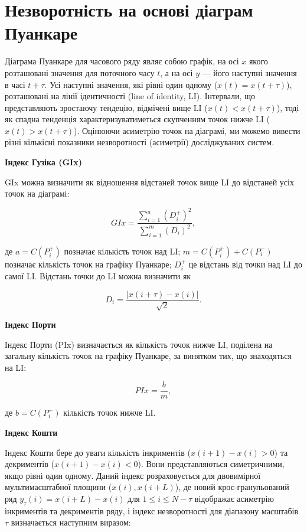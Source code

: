 \documentclass[
  letterpaper,
]{report}
\begin{document}
\hypertarget{ux43dux435ux437ux432ux43eux440ux43eux442ux43dux456ux441ux442ux44c-ux43dux430-ux43eux441ux43dux43eux432ux456-ux434ux456ux430ux433ux440ux430ux43c-ux43fux443ux430ux43dux43aux430ux440ux435}{%
\section{Незворотність на основі діаграм
Пуанкаре}\label{ux43dux435ux437ux432ux43eux440ux43eux442ux43dux456ux441ux442ux44c-ux43dux430-ux43eux441ux43dux43eux432ux456-ux434ux456ux430ux433ux440ux430ux43c-ux43fux443ux430ux43dux43aux430ux440ux435}}

Діаграма Пуанкаре для часового ряду являє собою графік, на осі \(x\)
якого розташовані значення для поточного часу \(t\), а на осі \(y\) ---
його наступні значення в часі \(t+\tau\). Усі наступні значення, які
рівні один одному (\(x(t) = x(t+\tau)\)), розташовані на лінії
ідентичності (line of identity, LI). Інтервали, що представляють
зростаючу тендецію, відмічені вище LI (\(x(t)<x(t+\tau)\)), тоді як
спадна тенденція характеризуватиметься скупченням точок нижче LI
(\(x(t)>x(t+\tau)\)). Оцінюючи асиметрію точок на діаграмі, ми можемо
вивести різні кількісні показники незворотності (асиметрії)
досліджуваних систем.

\textbf{Індекс Гузіка (GIx)}

GIx можна визначити як відношення відстаней точок вище LI до відстаней
усіх точок на діаграмі:

\[ 
GIx = \frac{\sum_{i=1}^{a} \left( D_{i}^{+} \right)^{2}}{\sum_{i=1}^{m} \left( D_{i} \right)^{2} }, 
\]

де \(a = C(P_{i}^{+})\) позначає кількість точок над LI;
\(m = C(P_{i}^{+}) + C(P_{i}^{-})\) позначає кількість точок на графіку
Пуанкаре; \(D_{i}^{+}\) це відстань від точки над LI до самої LI.
Відстань точки до LI можна визначити як

\[ 
D_{i} = \frac{|x(i+\tau) - x(i)|}{\sqrt{2}}. 
\]

\textbf{Індекс Порти}

Індекс Порти (PIx) визначається як кількість точок нижче LI, поділена на
загальну кількість точок на графіку Пуанкаре, за винятком тих, що
знаходяться на LI:

\[ 
PIx = \frac{b}{m}, 
\]

де \(b = C(P_{i}^{-})\) кількість точок нижче LI.

\textbf{Індекс Кошти}

Індекс Кошти бере до уваги кількість інкриментів (\(x(i+1)-x(i) > 0\))
та декриментів (\(x(i+1)-x(i) < 0\)). Вони представляються симетричними,
якщо рівні один одному. Даний індекс розраховується для двовимірної
мультимасштабної площини (\(x(i), x(i+L)\)), де новий крос-гранульований
ряд \(y_{\tau}(i) = x(i+L)-x(i)\) для \(1 \leq i \leq N-\tau\)
відображає асиметрію інкриментів та декриментів ряду, і індекс
незворотності для діапазону масштабів \(\tau\) визначається наступним
виразом:
\end{document}
